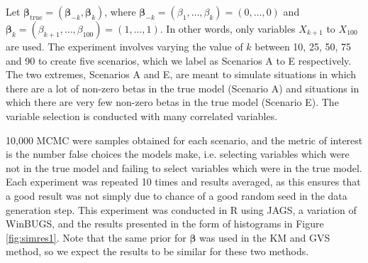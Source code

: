 Let $\boldsymbol\beta_{\text{true}} = (\boldsymbol\beta_{-k}, \boldsymbol\beta_{k})$, where $\boldsymbol\beta_{-k} = (\beta_1, \dots, \beta_k) = (0,\dots,0)$ and $\boldsymbol\beta_{k} = (\beta_{k+1}, \dots, \beta_{100}) = (1,\dots,1)$. In other words, only variables $X_{k+1}$ to $X_{100}$ are used. The experiment involves varying the value of $k$ between 10, 25, 50, 75 and 90 to create five scenarios, which we label as Scenarios A to E respectively. The two extremes, Scenarios A and E, are meant to simulate situations in which there are a lot of non-zero betas in the true model (Scenario A) and situations in which there are very few non-zero betas in the true model (Scenario E). The variable selection is conducted with many correlated variables.

10,000 MCMC were samples obtained for each scenario, and the metric of interest is the number false choices the models make, i.e. selecting variables which were not in the true model and failing to select variables which were in the true model. Each experiment was repeated 10 times and results averaged, as this ensures that a good result  was not simply due to chance of a good random seed in the data generation step. This experiment was conducted in R using JAGS, a variation of WinBUGS, and the results presented in the form of histograms in Figure \ref{fig:simres1}. Note that the same prior for $\boldsymbol{\beta}$ was used in the KM and GVS method, so we expect the results to be similar for these two methods.

